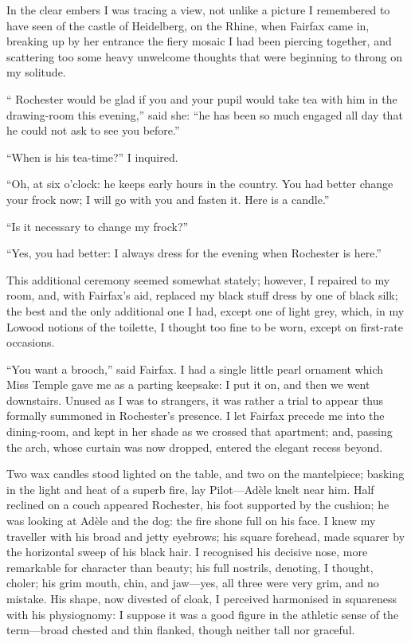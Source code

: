 In the clear embers I was tracing a view, not unlike a picture I
remembered to have seen of the castle of Heidelberg, on the Rhine, when
\Mrs{} Fairfax came in, breaking up by her entrance the fiery mosaic I had
been piercing together, and scattering too some heavy unwelcome thoughts
that were beginning to throng on my solitude.

\enquote{\Mr{} Rochester would be glad if you and your pupil would take
	tea with him in the drawing-room this evening,} said she: \enquote{he
	has been so much engaged all day that he could not ask to see you
	before.}

\enquote{When is his tea-time?} I inquired.

\enquote{Oh, at six o'clock: he keeps early hours in the country. You
	had better change your frock now; I will go with you and fasten it.
	Here is a candle.}

\enquote{Is it necessary to change my frock?}

\enquote{Yes, you had better: I always dress for the evening when \Mr{}
	Rochester is here.}

This additional ceremony seemed somewhat stately; however, I repaired to
my room, and, with \Mrs{} Fairfax's aid, replaced my black stuff dress by
one of black silk; the best and the only additional one I had, except
one of light grey, which, in my Lowood notions of the toilette, I
thought too fine to be worn, except on first-rate occasions.

\enquote{You want a brooch,} said \Mrs{} Fairfax. I had a single little
pearl ornament which Miss Temple gave me as a parting keepsake: I put it
on, and then we went downstairs. Unused as I was to strangers, it was
rather a trial to appear thus formally summoned in \Mr{} Rochester's
presence. I let \Mrs{} Fairfax precede me into the dining-room, and kept
in her shade as we crossed that apartment; and, passing the arch, whose
curtain was now dropped, entered the elegant recess beyond.

Two wax candles stood lighted on the table, and two on the mantelpiece;
basking in the light and heat of a superb fire, lay Pilot---Adèle knelt
near him. Half reclined on a couch appeared \Mr{} Rochester, his foot
supported by the cushion; he was looking at Adèle and the dog: the fire
shone full on his face. I knew my traveller with his broad and jetty
eyebrows; his square forehead, made squarer by the horizontal sweep of
his black hair. I recognised his decisive nose, more remarkable for
character than beauty; his full nostrils, denoting, I thought, choler;
his grim mouth, chin, and jaw---yes, all three were very grim, and no
mistake. His shape, now divested of cloak, I perceived harmonised in
squareness with his physiognomy: I suppose it was a good figure in the
athletic sense of the term---broad chested and thin flanked, though
neither tall nor graceful.

